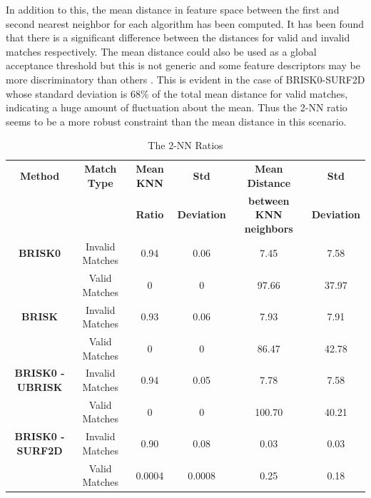 \documentclass[11pt]{report}
\begin{document}
In addition to this, the mean distance in feature space between the first and second nearest neighbor for each algorithm has been computed. It has been found that there is a significant difference between the distances for valid and invalid matches respectively. The mean distance could also be used as a global acceptance threshold but this is not generic and some feature descriptors may be more discriminatory than others \citep{Lowe2004}. This is evident in the case of BRISK0-SURF2D whose standard deviation is $68\%$ of the total mean distance for valid matches, indicating a huge amount of fluctuation about the mean. Thus the 2-NN ratio seems to be a more robust constraint than the mean distance in this scenario.\\

\begin{table}
\centering
\caption{The 2-NN Ratios}
\footnotesize
\begin{tabular}{|c|c|c|c|c|c|}
\hline 
\textbf{Method} & \textbf{Match Type} & \textbf{Mean KNN} & \textbf{Std } & \textbf{Mean Distance } & \textbf{Std }\tabularnewline
 &  & \textbf{ Ratio} & \textbf{Deviation} & \textbf{between KNN neighbors} & \textbf{Deviation}\tabularnewline
\hline 
\hline 
\textbf{BRISK0} & Invalid Matches & 0.94 & 0.06 & 7.45 & 7.58\tabularnewline
\hline 
 & Valid Matches & 0 & 0 & 97.66 & 37.97\tabularnewline
\hline 
\textbf{BRISK} & Invalid Matches & 0.93 & 0.06 & 7.93 & 7.91\tabularnewline
\hline 
 & Valid Matches & 0 & 0 & 86.47 & 42.78\tabularnewline
\hline 
\textbf{BRISK0 - UBRISK} & Invalid Matches & 0.94 & 0.05 & 7.78 & 7.58\tabularnewline
\hline 
 & Valid Matches & 0 & 0 & 100.70 & 40.21\tabularnewline
\hline 
\textbf{BRISK0 - SURF2D} & Invalid Matches & 0.90 & 0.08 & 0.03 & 0.03\tabularnewline
\hline 
 & Valid Matches & 0.0004 & 0.0008 & 0.25 & 0.18\tabularnewline
\hline 
\end{tabular}
\label{tab:knnCriterion}
\end{table}
\end{document}
